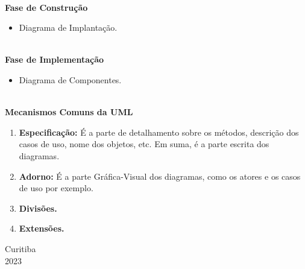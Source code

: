 \documentclass[12pt, a4paper]{article}
\begin{document}
\noindent
\textbf{\\Fase de Construção}
\begin{itemize}
    \item Diagrama de Implantação.
\end{itemize}

\noindent
\textbf{\\Fase de Implementação}
\begin{itemize}
    \item Diagrama de Componentes.
\end{itemize}

\newpage
\noindent
\textbf{\\Mecanismos Comuns da UML}

\begin{enumerate}[label*=\textbf{\arabic*}.]
    \item \textbf{Especificação:} É a parte de detalhamento sobre os métodos, descrição dos casos de uso, nome dos objetos, etc.
    Em suma, é a parte escrita dos diagramas.
    \item \textbf{Adorno:} É a parte Gráfica-Visual dos diagramas, como os atores e os casos de uso por exemplo.
    \item \textbf{Divisões.}
    \item \textbf{Extensões.}
\end{enumerate}

\vfill
\begin{center}
    Curitiba\\
    2023
\end{center}
\end{document}
